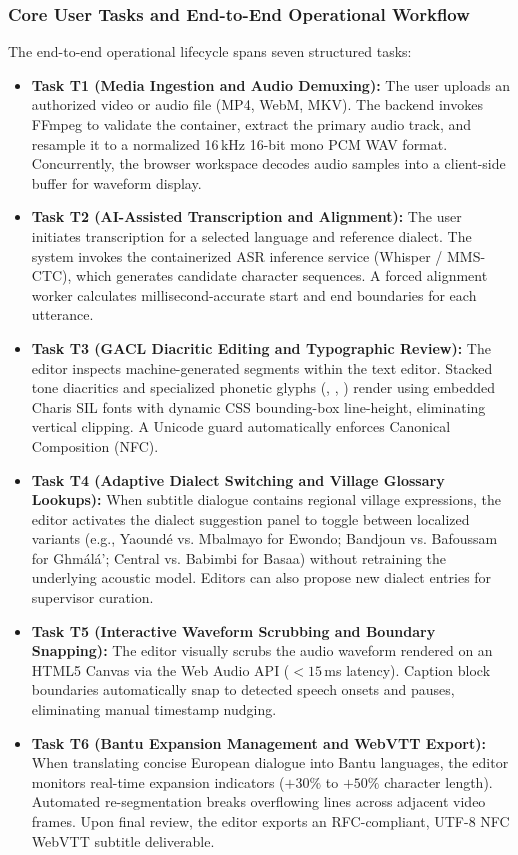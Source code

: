\documentclass[a4paper,11pt]{article}
\begin{document}
\subsubsection{Core User Tasks and End-to-End Operational Workflow}
\label{sec:chap3_ucd_tasks}
The end-to-end operational lifecycle spans seven structured tasks:
\begin{itemize}
    \item \textbf{Task T1 (Media Ingestion and Audio Demuxing):} The user uploads an authorized video or audio file (MP4, WebM, MKV). The backend invokes FFmpeg to validate the container, extract the primary audio track, and resample it to a normalized 16\,kHz 16-bit mono PCM WAV format. Concurrently, the browser workspace decodes audio samples into a client-side buffer for waveform display.
    \item \textbf{Task T2 (AI-Assisted Transcription and Alignment):} The user initiates transcription for a selected language and reference dialect. The system invokes the containerized ASR inference service (Whisper / MMS-CTC), which generates candidate character sequences. A forced alignment worker calculates millisecond-accurate start and end boundaries for each utterance.
    \item \textbf{Task T3 (GACL Diacritic Editing and Typographic Review):} The editor inspects machine-generated segments within the text editor. Stacked tone diacritics and specialized phonetic glyphs (\textopeno, \textschwa, \textipa{\ng}) render using embedded Charis SIL fonts with dynamic CSS bounding-box line-height, eliminating vertical clipping. A Unicode guard automatically enforces Canonical Composition (NFC).
    \item \textbf{Task T4 (Adaptive Dialect Switching and Village Glossary Lookups):} When subtitle dialogue contains regional village expressions, the editor activates the dialect suggestion panel to toggle between localized variants (e.g., Yaound\'e vs. Mbalmayo for Ewondo; Bandjoun vs. Bafoussam for Gh\textopeno m\'al\'a'; Central vs. Babimbi for Basaa) without retraining the underlying acoustic model. Editors can also propose new dialect entries for supervisor curation.
    \item \textbf{Task T5 (Interactive Waveform Scrubbing and Boundary Snapping):} The editor visually scrubs the audio waveform rendered on an HTML5 Canvas via the Web Audio API ($<15$\,ms latency). Caption block boundaries automatically snap to detected speech onsets and pauses, eliminating manual timestamp nudging.
    \item \textbf{Task T6 (Bantu Expansion Management and WebVTT Export):} When translating concise European dialogue into Bantu languages, the editor monitors real-time expansion indicators ($+30\%$ to $+50\%$ character length). Automated re-segmentation breaks overflowing lines across adjacent video frames. Upon final review, the editor exports an RFC-compliant, UTF-8 NFC WebVTT subtitle deliverable.

\end{itemize}
\end{document}
